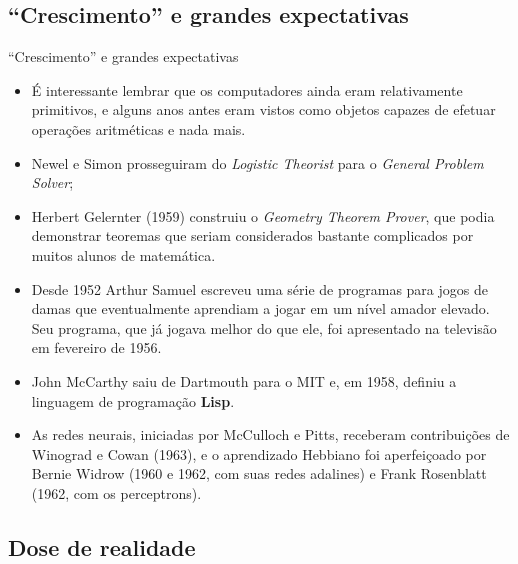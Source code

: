 \documentclass{libs/ufc_format}
\begin{document}
\subsection{``Crescimento'' e grandes expectativas}

\begin{frame}{``Crescimento'' e grandes expectativas}
    \begin{itemize}
        \justifying
        \small
        \item<1-2> É interessante lembrar que os computadores ainda eram relativamente primitivos, e alguns anos antes eram vistos como objetos capazes de efetuar operações aritméticas e nada mais.
        \item<2-3> Newel e Simon prosseguiram do \textit{Logistic Theorist} para o \textit{General Problem Solver};
        \item<3-4> Herbert Gelernter (1959) construiu o \textit{Geometry Theorem Prover}, que podia demonstrar teoremas que seriam considerados bastante complicados por muitos alunos de matemática.
        \item<4-5> Desde 1952 Arthur Samuel escreveu uma série de programas para jogos de damas que eventualmente aprendiam a jogar em um nível amador elevado. Seu programa, que já jogava melhor do que ele, foi apresentado na televisão em fevereiro de 1956.
        \item<5-6> John McCarthy saiu de Dartmouth para o MIT e, em 1958, definiu a linguagem de programação \textbf{Lisp}.
        \item<6> As redes neurais, iniciadas por McCulloch e Pitts, receberam contribuições de Winograd e Cowan (1963), e o aprendizado Hebbiano foi aperfeiçoado por Bernie Widrow (1960 e 1962, com suas redes adalines) e Frank Rosenblatt (1962, com os perceptrons).
    \end{itemize}
\end{frame}

\subsection{Dose de realidade}
\end{document}
